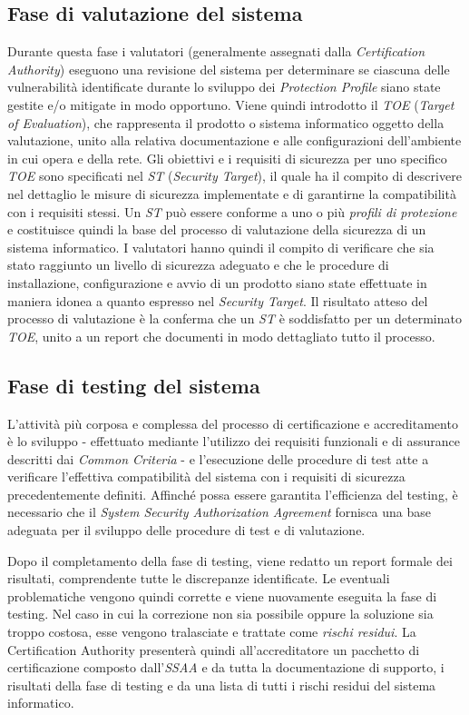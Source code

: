 \documentclass[../main.tex]{subfiles}
\begin{document}
\subsection{Fase di valutazione del sistema}
Durante questa fase i valutatori (generalmente assegnati dalla \textit{Certification Authority}) eseguono una revisione del sistema per determinare se ciascuna delle vulnerabilità identificate durante lo sviluppo dei \textit{Protection Profile} siano state gestite e/o mitigate in modo opportuno.
Viene quindi introdotto il \textit{TOE} (\textit{Target of Evaluation}), che rappresenta il prodotto o sistema informatico oggetto della valutazione, unito alla relativa documentazione e alle configurazioni dell'ambiente in cui opera e della rete.
Gli obiettivi e i requisiti di sicurezza per uno specifico \textit{TOE} sono specificati nel \textit{ST} (\textit{Security Target}), il quale ha il compito di descrivere nel dettaglio le misure di sicurezza implementate e di garantirne la compatibilità con i requisiti stessi.
Un \textit{ST} può essere conforme a uno o più \textit{profili di protezione} e costituisce quindi la base del processo di valutazione della sicurezza di un sistema informatico.
I valutatori hanno quindi il compito di verificare che sia stato raggiunto un livello di sicurezza adeguato e che le procedure di installazione, configurazione e avvio di un prodotto siano state effettuate in maniera idonea a quanto espresso nel \textit{Security Target}.
Il risultato atteso del processo di valutazione è la conferma che un \textit{ST} è soddisfatto per un determinato \textit{TOE}, unito a un report che documenti in modo dettagliato tutto il processo.

\subsection{Fase di testing del sistema}
L'attività più corposa e complessa del processo di certificazione e accreditamento è lo sviluppo - effettuato mediante l'utilizzo dei requisiti funzionali e di assurance descritti dai \textit{Common Criteria} - e l'esecuzione delle procedure di test atte a verificare l'effettiva compatibilità del sistema con i requisiti di sicurezza precedentemente definiti.
Affinché possa essere garantita l'efficienza del testing, è necessario che il \textit{System Security Authorization Agreement} fornisca una base adeguata per il sviluppo delle procedure di test e di valutazione.

Dopo il completamento della fase di testing, viene redatto un report formale dei risultati, comprendente tutte le discrepanze identificate.
Le eventuali problematiche vengono quindi corrette e viene nuovamente eseguita la fase di testing. Nel caso in cui la correzione non sia possibile oppure la soluzione sia troppo costosa, esse vengono tralasciate e trattate come \textit{rischi residui}.
La Certification Authority presenterà quindi all'accreditatore un pacchetto di certificazione composto dall'\textit{SSAA} e da tutta la documentazione di supporto, i risultati della fase di testing e da una lista di tutti i rischi residui del sistema informatico. 
\end{document}
